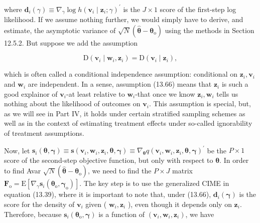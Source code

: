 \documentclass[10pt]{article}
\begin{document}
where $\mathbf{d}_{i}(\gamma) \equiv \nabla_{\gamma} \log h\left(\mathbf{v}_{i} \mid \mathbf{z}_{i} ; \gamma\right)^{\prime}$ is the $J \times 1$ score of the first-step log likelihood. If we assume nothing further, we would simply have to derive, and estimate, the asymptotic variance of $\sqrt{N}\left(\hat{\boldsymbol{\theta}}-\boldsymbol{\theta}_{\mathrm{o}}\right)$ using the methods in Section 12.5.2. But suppose we add the assumption


\begin{equation*}
\mathrm{D}\left(\mathbf{v}_{i} \mid \mathbf{w}_{i}, \mathbf{z}_{i}\right)=\mathrm{D}\left(\mathbf{v}_{i} \mid \mathbf{z}_{i}\right), \tag{13.66}
\end{equation*}


which is often called a conditional independence assumption: conditional on $\mathbf{z}_{i}, \mathbf{v}_{i}$ and $\mathbf{w}_{i}$ are independent. In a sense, assumption (13.66) means that $\mathbf{z}_{i}$ is such a good explainor of $\mathbf{v}_{i}$-at least relative to $\mathbf{w}_{i}$-that once we know $\mathbf{z}_{i}, \mathbf{w}_{i}$ tells us nothing about the likelihood of outcomes on $\mathbf{v}_{i}$. This assumption is special, but, as we will see in Part IV, it holds under certain stratified sampling schemes as well as in the context of estimating treatment effects under so-called ignorability of treatment assumptions.

Now, let $\mathbf{s}_{i}(\boldsymbol{\theta}, \boldsymbol{\gamma}) \equiv \mathbf{s}\left(\mathbf{v}_{i}, \mathbf{w}_{i}, \mathbf{z}_{i}, \boldsymbol{\theta}, \boldsymbol{\gamma}\right) \equiv \nabla_{\boldsymbol{\theta}} q\left(\mathbf{v}_{i}, \mathbf{w}_{i}, \mathbf{z}_{i}, \boldsymbol{\theta}, \boldsymbol{\gamma}\right)^{\prime}$ be the $P \times 1$ score of the second-step objective function, but only with respect to $\boldsymbol{\theta}$. In order to find Avar $\sqrt{N}\left(\hat{\boldsymbol{\theta}}-\boldsymbol{\theta}_{\mathrm{o}}\right)$, we need to find the $P \times J$ matrix $\mathbf{F}_{\mathrm{o}}=\mathrm{E}\left[\nabla_{\gamma} \mathbf{s}_{i}\left(\boldsymbol{\theta}_{\mathrm{o}}, \boldsymbol{\gamma}_{\mathrm{o}}\right)\right]$. The key step is to use the generalized CIME in equation (13.39), where it is important to note that, under (13.66), $\mathbf{d}_{i}(\boldsymbol{\gamma})$ is the score for the density of $\mathbf{v}_{i}$ given ( $\mathbf{w}_{i}, \mathbf{z}_{i}$ ), even though it depends only on $\mathbf{z}_{i}$. Therefore, because $\mathbf{s}_{i}\left(\boldsymbol{\theta}_{\mathrm{o}}, \boldsymbol{\gamma}\right)$ is a function of $\left(\mathbf{v}_{i}, \mathbf{w}_{i}, \mathbf{z}_{i}\right)$, we have
\end{document}
